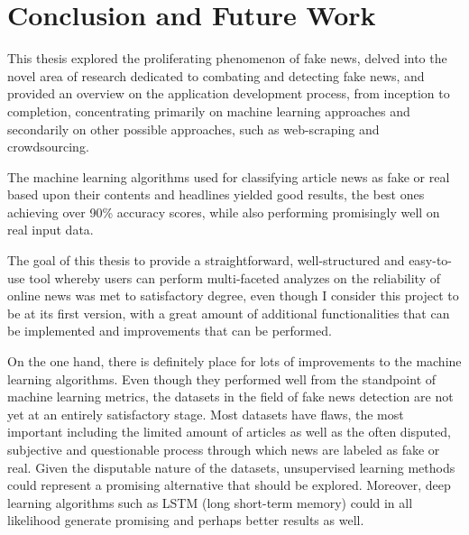 \documentclass[12pt, a4paper]{article}
\begin{document}
  \newpage

  

  \newpage
  \section{Conclusion and Future Work}
  This thesis explored the proliferating phenomenon of fake news, delved into the novel area of research dedicated to combating and detecting fake news, and provided an overview on the application development process, from inception to completion, concentrating primarily on machine learning approaches and secondarily on other possible approaches, such as web-scraping and crowdsourcing. 
  
  The machine learning algorithms used for classifying article news as fake or real based upon their contents and headlines yielded good results, the best ones achieving over 90\% accuracy scores, while also performing promisingly well on real input data.
  
  The goal of this thesis to provide a straightforward, well-structured and easy-to-use tool whereby users can perform multi-faceted analyzes on the reliability of online news was met to satisfactory degree, even though I consider this project to be at its first version, with a great amount of additional functionalities that can be implemented and improvements that can be performed. 
  
  On the one hand, there is definitely place for lots of improvements to the machine learning algorithms. Even though they performed well from the standpoint of machine learning metrics, the datasets in the field of fake news detection are not yet at an entirely satisfactory stage. Most datasets have flaws, the most important including the limited amount of articles as well as the often disputed, subjective and questionable process through which news are labeled as fake or real. Given the disputable nature of the datasets, unsupervised learning methods could represent a promising alternative that should be explored. Moreover, deep learning algorithms such as LSTM (long short-term memory) could in all likelihood generate promising and perhaps better results as well.
\end{document}
